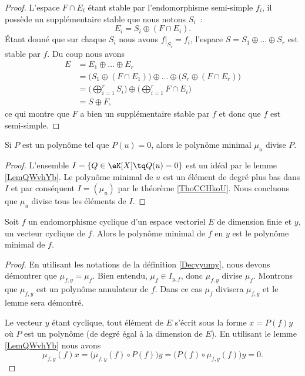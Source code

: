 \begin{proof}
    L'espace \( F\cap E_i\) étant stable par l'endomorphisme semi-simple \( f_i\), il possède un supplémentaire stable que nous notons \( S_i\)~:
    \begin{equation}
        E_i=S_i\oplus(F\cap E_i).
    \end{equation}
    Étant donné que sur chaque \( S_i\) nous avons \( f|_{S_i}=f_i\), l'espace \( S=S_1\oplus\ldots\oplus S_r\) est stable par \( f\). Du coup nous avons
    \begin{subequations}
        \begin{align}
            E&=E_1\oplus\ldots\oplus E_r\\
            &=\big( S_1\oplus(F\cap E_1) \big)\oplus\ldots\oplus\big( S_r\oplus(F\cap E_r) \big)\\
            &=\big( \bigoplus_{i=1}^rS_i \big)\oplus\big( \bigoplus_{i=1}^rF\cap E_i \big)\\
            &=S\oplus F,
        \end{align}
    \end{subequations}
    ce qui montre que \( F\) a bien un supplémentaire stable par \( f\) et donc que \( f\) est semi-simple.
\end{proof}

\begin{proposition}     \label{PropAnnncEcCxj}
    Si \( P\) est un polynôme tel que \( P(u)=0\), alors le polynôme minimal \( \mu_u\) divise \( P\).
\end{proposition}

\begin{proof}
    L'ensemble \( I=\{ Q\in \eK[X]\tq Q(u)=0 \}\) est un idéal par le lemme \ref{LemQWvhYb}. Le polynôme minimal de \( u\) est un élément de degré plus bas dans \( I\) et par conséquent \( I=(\mu_u)\) par le théorème \ref{ThoCCHkoU}. Nous concluons que \( \mu_u\) divise tous les éléments de \( I\).
\end{proof}

\begin{lemma}
    Soit \( f\) un endomorphisme cyclique d'un espace vectoriel \( E\) de dimension finie et \( y\), un vecteur cyclique de \( f\). Alors le polynôme minimal de \( f\) en \( y\) est le polynôme minimal de \( f\).
\end{lemma}

\begin{proof}
    En utilisant les notations de la définition \ref{Decyyumy}, nous devons démontrer que \( \mu_{f,y}=\mu_f\). Bien entendu, \( \mu_f\in I_{y,f}\), donc \( \mu_{f,y}\) divise \( \mu_f\). Montrons que \( \mu_{f,y}\) est un polynôme annulateur de \( f\). Dans ce cas \( \mu_f\) divisera \( \mu_{f,y}\) et le lemme sera démontré.

    Le vecteur \( y\) étant cyclique, tout élément de \( E\) s'écrit sous la forme \( x=P(f)y\) où \( P\) est un polynôme (de degré égal à la dimension de \( E\)). En utilisant le lemme \ref{LemQWvhYb} nous avons
    \begin{equation}
            \mu_{f,y}(f)x=\big( \mu_{f,y}(f)\circ P(f) \big)y
            =\big( P(f)\circ \mu_{f,y}(f) \big)y
            =0.
    \end{equation}
\end{proof}

